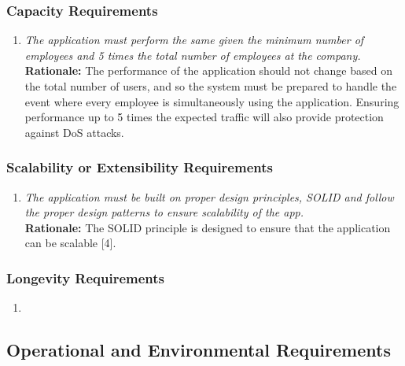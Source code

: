 \documentclass[]{article}
\begin{document}
\begin{enumerate}[{\bf BE1.}]
\subsubsection{Capacity Requirements}
\label{ssub:capacity_requirements}
\begin{enumerate}[{PR-C}1. ]
    \item \emph{The application must perform the same given the minimum number of employees and 5 times the total number of employees at the company.}\\
    {\bf Rationale:} The performance of the application should not change based on the total number of users, and so the system must be prepared to handle the event where every employee is simultaneously using the application. Ensuring performance up to 5 times the expected traffic will also provide protection against DoS attacks.
\end{enumerate}


\subsubsection{Scalability or Extensibility Requirements}
\label{ssub:scalability_or_extensibility_requirements}
\begin{enumerate}[{PR-SE}1. ]
    \item \emph{The application must be built on proper design principles, SOLID and follow the proper design patterns to ensure scalability of the app.}\\
    {\bf Rationale:} The SOLID principle is designed to ensure that the application can be scalable [4].
\end{enumerate}


\subsubsection{Longevity Requirements}
\label{ssub:longevity_requirements}
\begin{enumerate}[{N/A}]
    \item
\end{enumerate}




\subsection{Operational and Environmental Requirements}
\label{sub:operational_and_environmental_requirements}



\end{enumerate}
\end{document}
